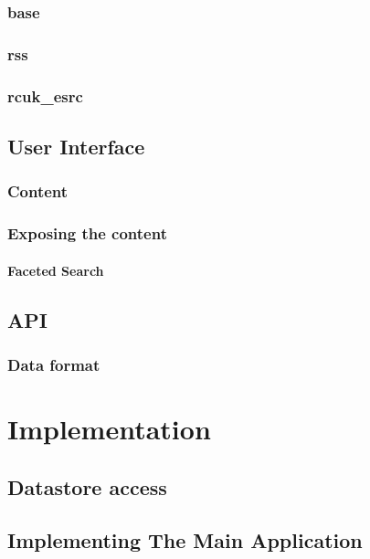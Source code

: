 \subsection{base}
\subsection{rss}
\subsection{rcuk\_esrc}
\section{User Interface}
\subsection{Content}
\subsection{Exposing the content}
\subsubsection{Faceted Search}
\section{API}
\subsection{Data format}
\chapter{Implementation}
\section{Datastore access}
\section{Implementing The Main Application}

